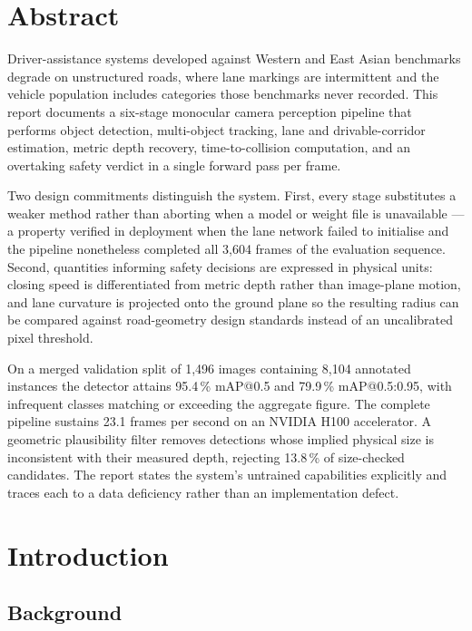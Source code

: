 \documentclass[11pt,a4paper]{report}
\begin{document}
\chapter*{Abstract}

Driver-assistance systems developed against Western and East Asian benchmarks
degrade on unstructured roads, where lane markings are intermittent and the
vehicle population includes categories those benchmarks never recorded. This
report documents a six-stage monocular camera perception pipeline that performs
object detection, multi-object tracking, lane and drivable-corridor estimation,
metric depth recovery, time-to-collision computation, and an overtaking safety
verdict in a single forward pass per frame.

Two design commitments distinguish the system. First, every stage substitutes a
weaker method rather than aborting when a model or weight file is unavailable —
a property verified in deployment when the lane network failed to initialise and
the pipeline nonetheless completed all 3{,}604 frames of the evaluation sequence.
Second, quantities informing safety decisions are expressed in physical units:
closing speed is differentiated from metric depth rather than image-plane
motion, and lane curvature is projected onto the ground plane so the resulting
radius can be compared against road-geometry design standards instead of an
uncalibrated pixel threshold.

On a merged validation split of 1{,}496 images containing 8{,}104 annotated
instances the detector attains 95.4\,\% mAP@0.5 and 79.9\,\% mAP@0.5:0.95, with
infrequent classes matching or exceeding the aggregate figure. The complete
pipeline sustains 23.1 frames per second on an NVIDIA H100 accelerator. A
geometric plausibility filter removes detections whose implied physical size is
inconsistent with their measured depth, rejecting 13.8\,\% of size-checked
candidates. The report states the system's untrained capabilities explicitly and
traces each to a data deficiency rather than an implementation defect.

\clearpage
{}
\setcounter{page}{1}

\chapter{Introduction}

\section{Background}
\end{document}
